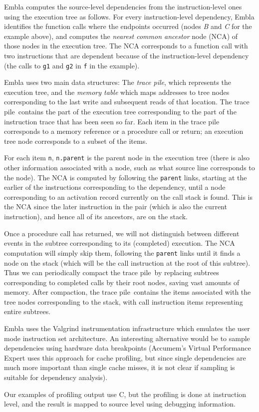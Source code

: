 Embla computes the source-level dependencies
from the instruction-level ones using the execution tree as follows. For
every instruction-level dependency, Embla identifies the function calls
where the endpoints occurred (nodes {\it B} and {\it C} for the example
above), and computes the {\em nearest common ancestor} node (NCA) of
those nodes in the execution tree. The NCA corresponds to a function
call with two instructions that are dependent because of
the instruction-level dependency (the calls to {\tt g1} and {\tt g2} in 
{\tt f} in the example).

\newcommand{\tracepile}{trace pile}


Embla uses two main data structures: The {\em \tracepile}, which represents
the execution tree, and the {\em memory table} which maps addresses to tree
nodes corresponding to the last write and subsequent reads of that
location. The \tracepile\ contains the part of the execution tree
corresponding to the part of the instruction trace that has been
seen so far. Each item in the trace pile corresponds to a memory reference 
or a procedure call or return; an execution tree node corresponds to
a subset of the items.

For each item {\tt n}, {\tt n.parent} is the parent node in the
execution tree (there is also other information associated with a
node, such as what source line corresponds to the node).  The NCA is
computed by following the {\tt parent} links, starting at the earlier
of the instructions corresponding to the dependency, until a node
corresponding to an activation record currently on the call stack is
found. This is the NCA since the later instruction in the pair (which
is also the current instruction), and hence all of its ancestors, are
on the stack.

Once a procedure call has returned, we will not distinguish between 
different events in the subtree corresponding to its (completed) 
execution. The NCA computation will simply skip them, following the 
{\tt parent} links until it finds a node on the stack (which will be
the call instruction at the root of this subtree). Thus we can 
periodically compact the \tracepile\ by replacing subtrees
corresponding to completed calls by their root nodes, saving vast amounts
of memory.
After compaction, the \tracepile\ contains the items associated with the
tree nodes corresponding to the stack, with call instruction items
representing entire subtrees.

Embla uses the Valgrind instrumentation infrastructure which emulates
the user mode instruction set architecture. An interesting alternative
would be to sample dependencies using hardware data breakpoints
(Accumem's Virtual Performance Expert uses this approach for cache
profiling, but since single dependencies are much more important than
single cache misses, it is not clear if sampling is suitable for
dependency analysis).

Our examples of profiling
output use C, but
the profiling is done at instruction level, and the result is
mapped to source level using debugging information.


